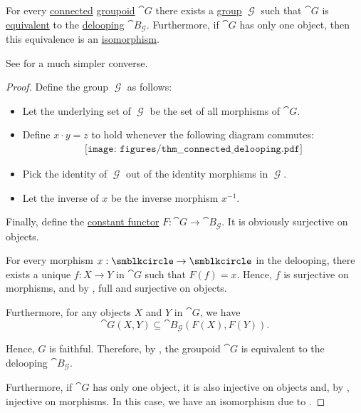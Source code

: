 \begin{proposition}\label{thm:connected_delooping}
  For every \hyperref[def:connected_category]{connected} \hyperref[def:groupoid]{groupoid} \( \cat{G} \) there exists a \hyperref[def:group]{group} \( \mscrG \) such that \( \cat{G} \) is \hyperref[def:category_equivalence]{equivalent} to the \hyperref[def:monoid_delooping]{delooping} \( \cat{B}_\mscrG \). Furthermore, if \( \cat{G} \) has only one object, then this equivalence is an \hyperref[rem:category_similarity/isomorphism]{isomorphism}.

  See  for a much simpler converse.
\end{proposition}
\begin{proof}
  Define the group \( \mscrG \) as follows:
  \begin{itemize}
    \item Let the underlying set of \( \mscrG \) be the set of all morphisms of \( \cat{G} \).
    \item Define \( x \cdot y = z \) to hold whenever the following diagram commutes:
    \begin{equation}\label{eq:thm:connected_delooping/mult}
      \begin{aligned}
        \texttt{[image: figures/thm\_\_connected\_delooping.pdf]}
      \end{aligned}
    \end{equation}
    \item Pick the identity of \( \mscrG \) out of the identity morphisms in \( \mscrG \).
    \item Let the inverse of \( x \) be the inverse morphism \( x^{-1} \).
  \end{itemize}

  Finally, define the \hyperref[ex:constant_functor]{constant functor} \( F: \cat{G} \to \cat{B}_\mscrG \). It is obviously surjective on objects.

  For every morphism \( x: \anon \to \anon \) in the delooping, there exists a unique \( f: X \to Y \) in \( \cat{G} \) such that \( F(f) = x \). Hence, \( f \) is surjective on morphisms, and by , full and surjective on objects.

  Furthermore, for any objects \( X \) and \( Y \) in \( \cat{G} \), we have
  \begin{equation*}
    \cat{G}(X, Y) \subseteq \cat{B}_\mscrG(F(X), F(Y)).
  \end{equation*}

  Hence, \( G \) is faithful. Therefore, by , the groupoid \( \cat{G} \) is equivalent to the delooping \( \cat{B}_\mscrG \).

  Furthermore, if \( \cat{G} \) has only one object, it is also injective on objects and, by , injective on morphisms. In this case, we have an isomorphism due to .
\end{proof}

